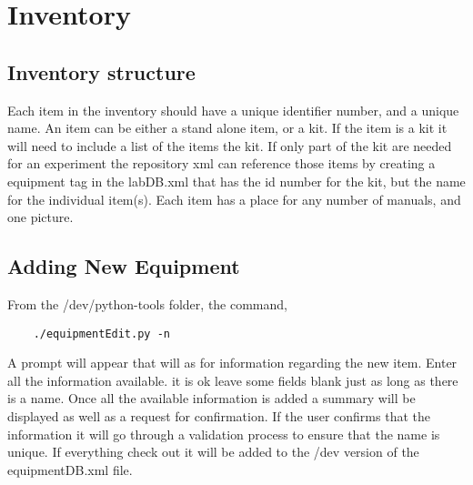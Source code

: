 \documentclass[justified]{book}
\begin{document}
\section{Inventory}

\subsection{Inventory structure}

Each item in the inventory should have a unique identifier number, and a unique name. An item can be either a stand alone item, or a kit. If the item is a kit it will need to include a list of the items the kit. If only part of the kit are needed for an experiment the repository xml can reference those items by creating a equipment tag in the labDB.xml that has the id number for the kit, but the name for the individual item(s). Each item has a place for any number of manuals, and one picture.\\



\subsection{Adding New Equipment}


From the /dev/python-tools folder, the command,

	\begin{lstlisting}
	./equipmentEdit.py -n       
	\end{lstlisting}

A prompt will appear that will as for information regarding the new item. Enter all the information available. it is ok leave some fields blank just as long as there is a name. Once all the available information is added a summary will be displayed as well as a request for confirmation. If the user confirms that the information it will go through a validation process to ensure that the name is unique. If everything check out it will be added to the /dev version of the equipmentDB.xml file.\\
\end{document}
